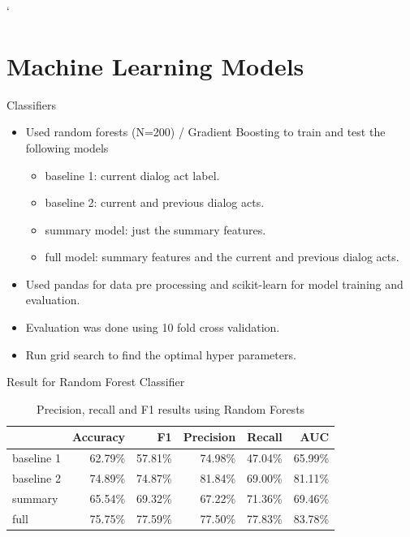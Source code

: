 `%

\section{Machine Learning Models}
\frame{\sectionpage}


\begin{frame}{Classifiers}
 \begin{itemize}
  \item Used random forests (N=200) / Gradient Boosting to train and test the following models
  \begin{itemize}
    \item baseline 1: current dialog act label.
    \item baseline 2: current and previous dialog acts.
    \item summary model: just the summary features.
    \item full model: summary features and the current and previous dialog acts.
  \end{itemize}
  \item Used pandas for data pre processing and scikit-learn for model training and evaluation.
  \item Evaluation was done using 10 fold cross validation.
  \item Run grid search to find the optimal hyper parameters.
  \end{itemize}
\end{frame}{}

\begin{frame}{Result for Random Forest Classifier}
\begin{table}[ht!]
\begin{center}
\begin{tabular}{lrrrrr}
\hline
{}  &  Accuracy &        F1 &  Precision &    Recall &   AUC \\
\hline
baseline 1 &  62.79\% &  57.81\% &   74.98\% &  47.04\% &  65.99\% \\
baseline 2 &  74.89\% &  74.87\% &   81.84\% &  69.00\% &  81.11\% \\
summary    &  65.54\% &  69.32\% &   67.22\% &  71.36\% &  69.46\% \\
full       &  75.75\% &  77.59\% &   77.50\% &  77.83\% &  83.78\% \\
\hline
\end{tabular}
\end{center}
\caption{Precision, recall and F1 results using Random Forests }
\label{table:result}
\end{table}
\end{frame}

